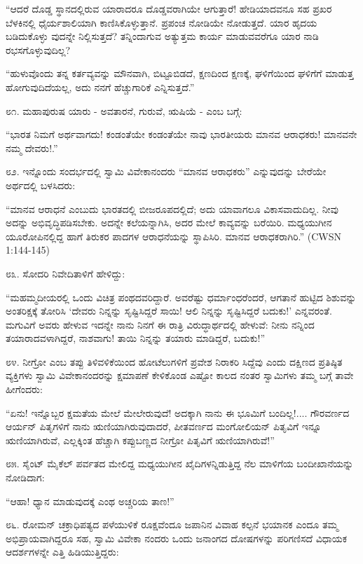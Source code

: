 “ಆದರೆ ದೊಡ್ಡ ಸ್ಥಾನದಲ್ಲಿರುವ ಯಾರಾದರೂ ದೊಡ್ಡವರಾಗಿಯೇ ಆಗುತ್ತಾರೆ! ಹೇಡಿಯಾದವನೂ ಸಹ ಪ್ರಖರ ಬೆಳಕಿನಲ್ಲಿ ಧೈರ್ಯಶಾಲಿಯಾಗಿ ಕಾಣಿಸಿಕೊಳ್ಳುತ್ತಾನೆ. ಪ್ರಪಂಚ ನೋಡಿಯೇ ನೋಡುತ್ತದೆ. ಯಾರ ಹೃದಯ ಬಡಿದುಕೊಳ್ಳು ವುದನ್ನೇ ನಿಲ್ಲಿಸುತ್ತದೆ? ತನ್ನಿಂದಾಗುವ ಅತ್ಯುತ್ತಮ ಕಾರ್ಯ ಮಾಡುವವರೆಗೂ ಯಾರ ನಾಡಿ ರಭಸಗೊಳ್ಳುವುದಿಲ್ಲ?

“ಹುಳುವೊಂದು ತನ್ನ ಕರ್ತವ್ಯವನ್ನು ಮೌನವಾಗಿ, ಬಿಟ್ಟೂಬಿಡದೆ, ಕ್ಷಣದಿಂದ ಕ್ಷಣಕ್ಕೆ, ಘಳಿಗೆಯಿಂದ ಘಳಿಗೆಗೆ ಮಾಡುತ್ತ ಹೋಗುವುದಿದೆಯಲ್ಲ, ಅದು ನನಗೆ ಹೆಚ್ಚುಗಾರಿಕೆ ಎನ್ನಿಸುತ್ತದೆ.” 

೮೧. ಮಹಾಪುರುಷ ಯಾರು - ಅವತಾರನೆ, ಗುರುವೆ, ಋಷಿಯೆ - ಎಂಬ ಬಗ್ಗೆ:

“ಭಾರತ ನಿಮಗೆ ಅರ್ಥವಾಗದು! ಕಂಡಂತೆಯೇ ಕಂಡಂತೆಯೇ ನಾವು ಭಾರತೀಯರು ಮಾನವ ಆರಾಧಕರು! ಮಾನವನೇ ನಮ್ಮ ದೇವರು!.” 

೮೨. ಇನ್ನೊಂದು ಸಂದರ್ಭದಲ್ಲಿ ಸ್ವಾಮಿ ವಿವೇಕಾನಂದರು “ಮಾನವ ಆರಾಧಕರು” ಎನ್ನುವುದನ್ನು ಬೇರೆಯೇ ಅರ್ಥದಲ್ಲಿ ಬಳಸಿದರು:

“ಮಾನವ ಆರಾಧನೆ ಎಂಬುದು ಭಾರತದಲ್ಲಿ ಬೀಜರೂಪದಲ್ಲಿದೆ; ಅದು ಯಾವಾಗಲೂ ವಿಕಾಸವಾದುದಿಲ್ಲ. ನೀವು ಅದನ್ನು ಅಭಿವೃದ್ಧಿಪಡಿಸಬೇಕು. ಅದನ್ನೇ ಕಲೆಯನ್ನಾಗಿಸಿ, ಅದರ ಮೇಲೆ ಕಾವ್ಯವನ್ನು ಬರೆಯಿರಿ. ಮಧ್ಯಯುಗೀನ ಯೂರೋಪಿನಲ್ಲಿದ್ದ ಹಾಗೆ ತಿರುಕರ ಪಾದಗಳ ಆರಾಧನೆಯನ್ನು ಸ್ಥಾಪಿಸಿರಿ. ಮಾನವ ಆರಾಧಕರಾಗಿರಿ.” (CWSN 1:144-145)

೮೩. ಸೋದರಿ ನಿವೇದಿತಾಳಿಗೆ ಹೇಳಿದ್ದು:

“ಮಹಮ್ಮದೀಯರಲ್ಲಿ ಒಂದು ವಿಚಿತ್ರ ಪಂಥದವರಿದ್ದಾರೆ. ಅವರೆಷ್ಟು ಧರ್ಮಾಂಧರೆಂದರೆ, ಆಗತಾನೆ ಹುಟ್ಟಿದ ಶಿಶುವನ್ನು ಅಂತರಿಕ್ಷಕ್ಕೆ ತೋರಿಸಿ ‘ದೇವರು ನಿನ್ನನ್ನು ಸೃಷ್ಟಿಸಿದ್ದರೆ ಸಾಯಿ! ಆಲಿ ನಿನ್ನನ್ನು ಸೃಷ್ಟಿಸಿದ್ದರೆ ಬದುಕು!’ ಎನ್ನವರಂತೆ. ಮಗುವಿಗೆ ಅವರು ಹೇಳುವ ಇದನ್ನೇ ನಾನು ನಿನಗೆ ಈ ರಾತ್ರಿ ವಿರುದ್ಧಾರ್ಥದಲ್ಲಿ ಹೇಳುವೆ: ನೀನು ನನ್ನಿಂದ ತಯಾರಾದವಳಾಗಿದ್ದರೆ, ನಾಶವಾಗು! ತಾಯಿ ನಿನ್ನನ್ನು ತಯಾರು ಮಾಡಿದ್ದರೆ, ಬದುಕು!” 

೮೪. ನೀಗ್ರೋ ಎಂಬ ತಪ್ಪು ತಿಳಿವಳಿಕೆಯಿಂದ ಹೋಟೆಲುಗಳಿಗೆ ಪ್ರವೇಶ ನಿರಾಕರಿ ಸಿದ್ದೆವು ಎಂದು ದಕ್ಷಿಣದ ಪ್ರತಿಷ್ಠಿತ ವ್ಯಕ್ತಿಗಳು ಸ್ವಾಮಿ ವಿವೇಕಾನಂದರನ್ನು ಕ್ಷಮಾಪಣೆ ಕೇಳಿಕೊಂಡ ಎಷ್ಟೋ ಕಾಲದ ನಂತರ ಸ್ವಾಮಿಗಳು ತಮ್ಮ ಬಗ್ಗೆ ತಾವೇ ಹೀಗೆಂದರು:

“ಏನು! ಇನ್ನೊಬ್ಬರ ಕ್ಷಮತೆಯ ಮೇಲೆ ಮೇಲೇರುವುದೆ! ಅದಕ್ಕಾಗಿ ನಾನು ಈ ಭೂಮಿಗೆ ಬಂದಿಲ್ಲ!.... ಗೌರವರ್ಣದ ಆರ್ಯನ್ ಪಿತೃಗಳಿಗೆ ನಾನು ಋಣಿಯಾಗಿರುವುದಾದರೆ, ಪೀತವರ್ಣದ ಮಂಗೋಲಿಯನ್ ಪಿತೃವಿಗೆ ಇನ್ನೂ ಋಣಿಯಾಗಿರುವೆ, ಎಲ್ಲಕ್ಕಿಂತ ಹೆಚ್ಚಾಗಿ ಕಪ್ಪುಬಣ್ಣದ ನೀಗ್ರೋ ಪಿತೃವಿಗೆ ಋಣಿಯಾಗಿರುವೆ!” 

೮೫. ಸೈಂಟ್ ಮೈಕೆಲ್ ಪರ್ವತದ ಮೇಲಿದ್ದ ಮಧ್ಯಯುಗೀನ ಖೈದಿಗಳನ್ನಿಡುತ್ತಿದ್ದ ನೆಲ ಮಾಳಿಗೆಯ ಬಂದೀಖಾನೆಯನ್ನು ನೋಡಿದಾಗ:

“ಆಹಾ! ಧ್ಯಾನ ಮಾಡುವುದಕ್ಕೆ ಎಂಥ ಅಚ್ಚರಿಯ ತಾಣ!” 

೮೬. ರೋಮನ್ ಚಕ್ರಾಧಿಪತ್ಯದ ಪಳೆಯುಳಿಕೆ ರೂಕ್ಷವೆಂದೂ ಜಪಾನಿನ ವಿವಾಹ ಕಲ್ಪನೆ ಭಯಾನಕ ಎಂದೂ ತಮ್ಮ ಅಭಿಪ್ರಾಯವಾಗಿದ್ದರೂ ಸಹ, ಸ್ವಾಮಿ ವಿವೇಕಾ ನಂದರು ಒಂದು ಜನಾಂಗದ ದೋಷಗಳನ್ನು ಪರಿಗಣಿಸದೆ ವಿಧಾಯಕ ಆದರ್ಶಗಳನ್ನೇ ಎತ್ತಿ ಹಿಡಿಯುತ್ತಿದ್ದರು:

